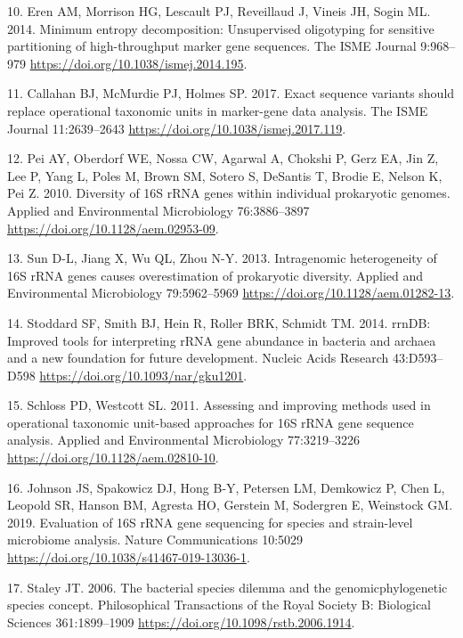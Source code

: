 \documentclass[
]{article}
\newenvironment{cslreferences}%
  {}%
  {\par}
\begin{document}
\begin{cslreferences}
\leavevmode\hypertarget{ref-Eren2014}{}%
10. Eren AM, Morrison HG, Lescault PJ, Reveillaud J, Vineis JH, Sogin
ML. 2014. Minimum entropy decomposition: Unsupervised oligotyping for
sensitive partitioning of high-throughput marker gene sequences. The
ISME Journal 9:968--979 \url{https://doi.org/10.1038/ismej.2014.195}.

\leavevmode\hypertarget{ref-Callahan2017}{}%
11. Callahan BJ, McMurdie PJ, Holmes SP. 2017. Exact sequence variants
should replace operational taxonomic units in marker-gene data analysis.
The ISME Journal 11:2639--2643
\url{https://doi.org/10.1038/ismej.2017.119}.

\leavevmode\hypertarget{ref-Pei2010}{}%
12. Pei AY, Oberdorf WE, Nossa CW, Agarwal A, Chokshi P, Gerz EA, Jin Z,
Lee P, Yang L, Poles M, Brown SM, Sotero S, DeSantis T, Brodie E, Nelson
K, Pei Z. 2010. Diversity of 16S rRNA genes within individual
prokaryotic genomes. Applied and Environmental Microbiology
76:3886--3897 \url{https://doi.org/10.1128/aem.02953-09}.

\leavevmode\hypertarget{ref-Sun2013}{}%
13. Sun D-L, Jiang X, Wu QL, Zhou N-Y. 2013. Intragenomic heterogeneity
of 16S rRNA genes causes overestimation of prokaryotic diversity.
Applied and Environmental Microbiology 79:5962--5969
\url{https://doi.org/10.1128/aem.01282-13}.

\leavevmode\hypertarget{ref-Stoddard2014}{}%
14. Stoddard SF, Smith BJ, Hein R, Roller BRK, Schmidt TM. 2014. rrnDB:
Improved tools for interpreting rRNA gene abundance in bacteria and
archaea and a new foundation for future development. Nucleic Acids
Research 43:D593--D598 \url{https://doi.org/10.1093/nar/gku1201}.

\leavevmode\hypertarget{ref-Schloss2011}{}%
15. Schloss PD, Westcott SL. 2011. Assessing and improving methods used
in operational taxonomic unit-based approaches for 16S rRNA gene
sequence analysis. Applied and Environmental Microbiology 77:3219--3226
\url{https://doi.org/10.1128/aem.02810-10}.

\leavevmode\hypertarget{ref-Johnson2019}{}%
16. Johnson JS, Spakowicz DJ, Hong B-Y, Petersen LM, Demkowicz P, Chen
L, Leopold SR, Hanson BM, Agresta HO, Gerstein M, Sodergren E, Weinstock
GM. 2019. Evaluation of 16S rRNA gene sequencing for species and
strain-level microbiome analysis. Nature Communications 10:5029
\url{https://doi.org/10.1038/s41467-019-13036-1}.

\leavevmode\hypertarget{ref-Staley2006}{}%
17. Staley JT. 2006. The bacterial species dilemma and the
genomicphylogenetic species concept. Philosophical Transactions of the
Royal Society B: Biological Sciences 361:1899--1909
\url{https://doi.org/10.1098/rstb.2006.1914}.


\end{cslreferences}
\end{document}
